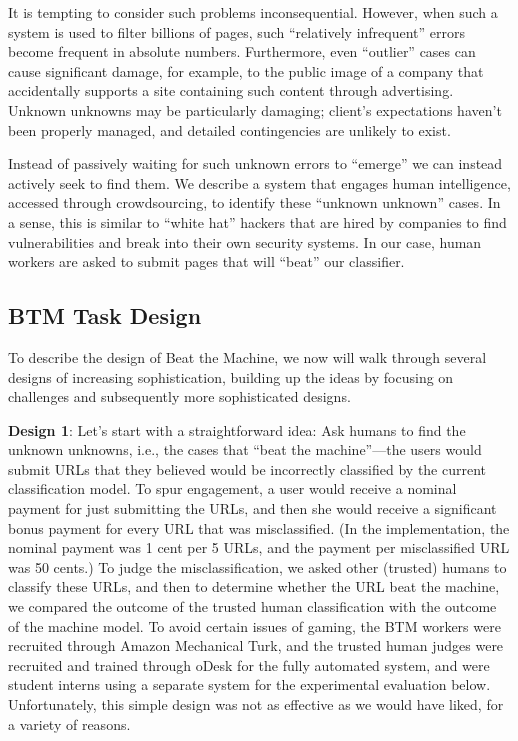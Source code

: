 It is tempting to consider such problems inconsequential. However, when such a system is used to filter billions of pages, such ``relatively infrequent'' errors become frequent in absolute numbers. Furthermore, even ``outlier'' cases can cause significant damage, for example, to the public image of a company that accidentally supports a site containing such content through advertising. Unknown unknowns may be particularly damaging; client's expectations haven't been properly managed, and detailed contingencies are unlikely to exist. 

Instead of passively waiting for such unknown errors to ``emerge'' we can instead actively seek to find them. We describe a system that engages human intelligence, accessed through crowdsourcing, to identify these ``unknown unknown'' cases. In a sense, this is similar to ``white hat'' hackers that are hired by companies to find vulnerabilities and break into their own security systems. In our case, human workers are asked to submit pages that will ``beat'' our classifier.

\subsection{BTM Task Design}

To describe the design of Beat the Machine, we now will walk through several designs of increasing sophistication, building up the ideas by focusing on challenges and subsequently more sophisticated designs.

\textbf{Design 1}: Let's start with a straightforward idea: Ask humans to find the unknown unknowns, i.e., the cases that ``beat the machine''---the users would submit URLs that they believed would be incorrectly classified by the current classification model.  To spur engagement, a user would receive a nominal payment for just submitting the URLs, and then she would receive a significant bonus payment for every URL that was misclassified. (In the implementation, the nominal payment was 1 cent per 5 URLs, and the payment per misclassified URL was 50 cents.)  To judge the misclassification, we asked other (trusted) humans to classify these URLs, and then to determine whether the URL beat the machine, we compared the outcome of the trusted human classification with the outcome of the machine model. To avoid certain issues of gaming, the BTM workers were recruited through Amazon Mechanical Turk, and the trusted human judges were recruited and trained through oDesk for the fully automated system, and were student interns using a separate system for the experimental evaluation below.  Unfortunately, this simple design was not as effective as we would have liked, for a variety of reasons.

